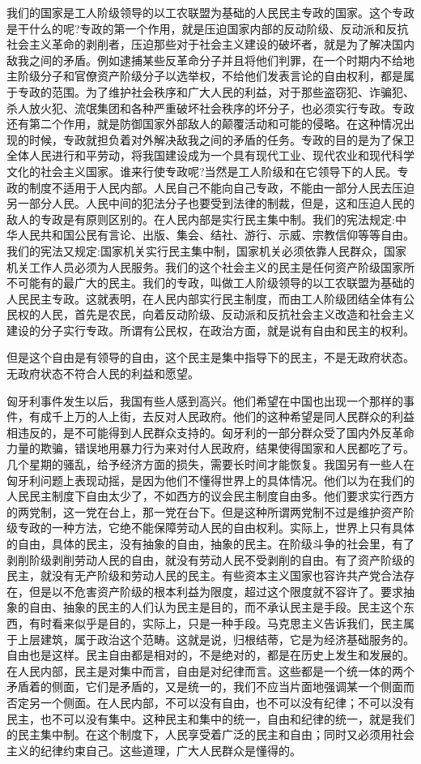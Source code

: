 \documentclass[UTF8, 12pt, a4paper]{ctexrep}
\begin{document}
我们的国家是工人阶级领导的以工农联盟为基础的人民民主专政的国家。这个专政是干什么的呢?专政的第一个作用，就是压迫国家内部的反动阶级、反动派和反抗社会主义革命的剥削者，压迫那些对于社会主义建设的破坏者，就是为了解决国内敌我之间的矛盾。例如逮捕某些反革命分子并且将他们判罪，在一个时期内不给地主阶级分子和官僚资产阶级分子以选举权，不给他们发表言论的自由权利，都是属于专政的范围。为了维护社会秩序和广大人民的利益，对于那些盗窃犯、诈骗犯、杀人放火犯、流氓集团和各种严重破坏社会秩序的坏分子，也必须实行专政。专政还有第二个作用，就是防御国家外部敌人的颠覆活动和可能的侵略。在这种情况出现的时候，专政就担负着对外解决敌我之间的矛盾的任务。专政的目的是为了保卫全体人民进行和平劳动，将我国建设成为一个具有现代工业、现代农业和现代科学文化的社会主义国家。谁来行使专政呢?当然是工人阶级和在它领导下的人民。专政的制度不适用于人民内部。人民自己不能向自己专政，不能由一部分人民去压迫另一部分人民。人民中间的犯法分子也要受到法律的制裁，但是，这和压迫人民的敌人的专政是有原则区别的。在人民内部是实行民主集中制。我们的宪法规定:中华人民共和国公民有言论、出版、集会、结社、游行、示威、宗教信仰等等自由。我们的宪法又规定:国家机关实行民主集中制，国家机关必须依靠人民群众，国家机关工作人员必须为人民服务。我们的这个社会主义的民主是任何资产阶级国家所不可能有的最广大的民主。我们的专政，叫做工人阶级领导的以工农联盟为基础的人民民主专政。这就表明，在人民内部实行民主制度，而由工人阶级团结全体有公民权的人民，首先是农民，向着反动阶级、反动派和反抗社会主义改造和社会主义建设的分子实行专政。所谓有公民权，在政治方面，就是说有自由和民主的权利。

但是这个自由是有领导的自由，这个民主是集中指导下的民主，不是无政府状态。无政府状态不符合人民的利益和愿望。

匈牙利事件发生以后，我国有些人感到高兴。他们希望在中国也出现一个那样的事件，有成千上万的人上街，去反对人民政府。他们的这种希望是同人民群众的利益相违反的，是不可能得到人民群众支持的。匈牙利的一部分群众受了国内外反革命力量的欺骗，错误地用暴力行为来对付人民政府，结果使得国家和人民都吃了亏。几个星期的骚乱，给予经济方面的损失，需要长时间才能恢复。我国另有一些人在匈牙利问题上表现动摇，是因为他们不懂得世界上的具体情况。他们以为在我们的人民民主制度下自由太少了，不如西方的议会民主制度自由多。他们要求实行西方的两党制，这一党在台上，那一党在台下。但是这种所谓两党制不过是维护资产阶级专政的一种方法，它绝不能保障劳动人民的自由权利。实际上，世界上只有具体的自由，具体的民主，没有抽象的自由，抽象的民主。在阶级斗争的社会里，有了剥削阶级剥削劳动人民的自由，就没有劳动人民不受剥削的自由。有了资产阶级的民主，就没有无产阶级和劳动人民的民主。有些资本主义国家也容许共产党合法存在，但是以不危害资产阶级的根本利益为限度，超过这个限度就不容许了。要求抽象的自由、抽象的民主的人们认为民主是目的，而不承认民主是手段。民主这个东西，有时看来似乎是目的，实际上，只是一种手段。马克思主义告诉我们，民主属于上层建筑，属于政治这个范畴。这就是说，归根结蒂，它是为经济基础服务的。自由也是这样。民主自由都是相对的，不是绝对的，都是在历史上发生和发展的。在人民内部，民主是对集中而言，自由是对纪律而言。这些都是一个统一体的两个矛盾着的侧面，它们是矛盾的，又是统一的，我们不应当片面地强调某一个侧面而否定另一个侧面。在人民内部，不可以没有自由，也不可以没有纪律；不可以没有民主，也不可以没有集中。这种民主和集中的统一，自由和纪律的统一，就是我们的民主集中制。在这个制度下，人民享受着广泛的民主和自由；同时又必须用社会主义的纪律约束自己。这些道理，广大人民群众是懂得的。
\end{document}
